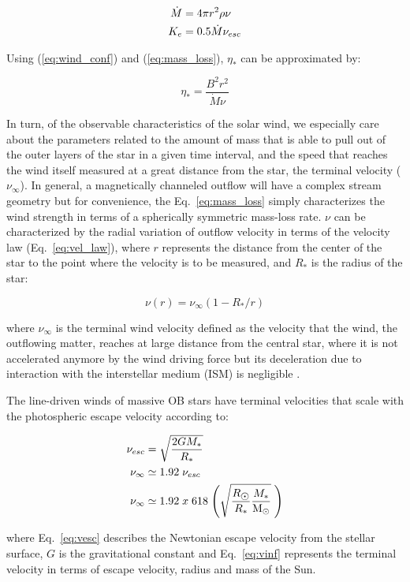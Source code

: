 \documentclass[fleqn,usenatbib]{mnras}
\begin{document}
\begin{ceqn}
\begin{align}
    \Dot{M} &= 4\pi r^2\rho\nu \label{eq:mass_loss}\\
    K_e &= 0.5\Dot{M}\nu_{esc}
\end{align}
\end{ceqn}

Using (\ref{eq:wind_conf}) and (\ref{eq:mass_loss}), $\eta_*$ can be approximated by: 
\begin{ceqn}
\begin{equation}
    \eta_* = \frac{B^{2}r^{2}}{\Dot{M}\nu} \label{eq:wind_conf2}
\end{equation}
\end{ceqn}

In turn, of the observable characteristics of the solar wind, we especially care about the parameters related to the amount of mass that is able to pull out of the outer layers of the star in a given time interval, and the speed that reaches the wind itself measured at a great distance from the star, the terminal velocity ($\nu_\infty$). In general, a magnetically channeled outflow will have a complex stream geometry but for convenience, the Eq.~\ref{eq:mass_loss} simply characterizes the wind strength in terms of a spherically symmetric mass-loss rate. $\nu$ can be characterized by the radial variation of outflow velocity in terms of the velocity law (Eq.~\ref{eq:vel_law}), where $r$ represents the distance from the center of the star to the point where the velocity is to be measured, and $R_*$ is the radius of the star:
\begin{ceqn}
\begin{equation}
    \nu(r) = \nu_\infty (1-R_*/r) \label{eq:vel_law}
\end{equation}
\end{ceqn}
where $\nu_\infty$ is the terminal wind velocity defined as the velocity that the wind, the outflowing matter, reaches at large distance from the central star, where it is not accelerated anymore by the wind driving force but its deceleration due to interaction with the interstellar medium (ISM) is negligible \citep{Niedzielski2002}.\par

The line-driven winds of massive OB stars have terminal velocities that scale with the photospheric escape velocity \citep{Lamers2000} according to:
\begin{ceqn}
\begin{align}
\nu_{esc} &= \sqrt{\frac{2GM_*}{R_*}} \label{eq:vesc} \\
\nu_\infty &\simeq 1.92 \;\nu_{esc}\\
\nu_\infty &\simeq 1.92 \; x \; 618 \; \Bigg(\sqrt{\frac{R_{\hbox{$\odot$}}}{R_*}\frac{M_*}{\mathrm{M}_\odot}} \;\Bigg) \label{eq:vinf}
\end{align}
\end{ceqn}
where Eq.~\ref{eq:vesc} describes the Newtonian escape velocity from the stellar surface, $G$ is the gravitational constant and Eq.~\ref{eq:vinf} represents the terminal velocity in terms of escape velocity, radius and mass of the Sun.\par
\end{document}
